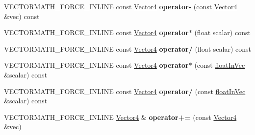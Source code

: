 \begin{DoxyCompactItemize}
\item 
\mbox{\label{classVectormath_1_1Aos_1_1Vector4_a70627bff0b5d5c80dad2e3d9117779cf}} 
V\+E\+C\+T\+O\+R\+M\+A\+T\+H\+\_\+\+F\+O\+R\+C\+E\+\_\+\+I\+N\+L\+I\+NE const \hyperlink{classVectormath_1_1Aos_1_1Vector4}{Vector4} {\bfseries operator-\/} (const \hyperlink{classVectormath_1_1Aos_1_1Vector4}{Vector4} \&vec) const
\item 
\mbox{\label{classVectormath_1_1Aos_1_1Vector4_a24a69ae05a7f0c96e13c5c0a27030b3a}} 
V\+E\+C\+T\+O\+R\+M\+A\+T\+H\+\_\+\+F\+O\+R\+C\+E\+\_\+\+I\+N\+L\+I\+NE const \hyperlink{classVectormath_1_1Aos_1_1Vector4}{Vector4} {\bfseries operator$\ast$} (float scalar) const
\item 
\mbox{\label{classVectormath_1_1Aos_1_1Vector4_a96d0690412407aca6ba0eab8c582aa54}} 
V\+E\+C\+T\+O\+R\+M\+A\+T\+H\+\_\+\+F\+O\+R\+C\+E\+\_\+\+I\+N\+L\+I\+NE const \hyperlink{classVectormath_1_1Aos_1_1Vector4}{Vector4} {\bfseries operator/} (float scalar) const
\item 
\mbox{\label{classVectormath_1_1Aos_1_1Vector4_aaf87d624e576bb033c7e1de24826d869}} 
V\+E\+C\+T\+O\+R\+M\+A\+T\+H\+\_\+\+F\+O\+R\+C\+E\+\_\+\+I\+N\+L\+I\+NE const \hyperlink{classVectormath_1_1Aos_1_1Vector4}{Vector4} {\bfseries operator$\ast$} (const \hyperlink{classVectormath_1_1floatInVec}{float\+In\+Vec} \&scalar) const
\item 
\mbox{\label{classVectormath_1_1Aos_1_1Vector4_a741b9c66d4715daf8a40f732523f628e}} 
V\+E\+C\+T\+O\+R\+M\+A\+T\+H\+\_\+\+F\+O\+R\+C\+E\+\_\+\+I\+N\+L\+I\+NE const \hyperlink{classVectormath_1_1Aos_1_1Vector4}{Vector4} {\bfseries operator/} (const \hyperlink{classVectormath_1_1floatInVec}{float\+In\+Vec} \&scalar) const
\item 
\mbox{\label{classVectormath_1_1Aos_1_1Vector4_ae24d5950c0c5eb7f00d07b8cb6f652c5}} 
V\+E\+C\+T\+O\+R\+M\+A\+T\+H\+\_\+\+F\+O\+R\+C\+E\+\_\+\+I\+N\+L\+I\+NE \hyperlink{classVectormath_1_1Aos_1_1Vector4}{Vector4} \& {\bfseries operator+=} (const \hyperlink{classVectormath_1_1Aos_1_1Vector4}{Vector4} \&vec)
\item 

\end{DoxyCompactItemize}
